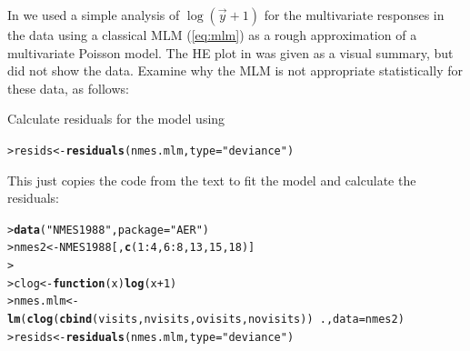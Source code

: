 \documentclass[10pt]{report}\usepackage[]{graphicx}\usepackage[]{color}
\makeatletter
\newcommand{\hlnum}[1]{\textcolor[rgb]{0.686,0.059,0.569}{#1}}%
\newcommand{\hlstr}[1]{\textcolor[rgb]{0.192,0.494,0.8}{#1}}%
\newcommand{\hlopt}[1]{\textcolor[rgb]{0,0,0}{#1}}%
\newcommand{\hlstd}[1]{\textcolor[rgb]{0.345,0.345,0.345}{#1}}%
\newcommand{\hlkwa}[1]{\textcolor[rgb]{0.161,0.373,0.58}{\textbf{#1}}}%
\newcommand{\hlkwb}[1]{\textcolor[rgb]{0.69,0.353,0.396}{#1}}%
\newcommand{\hlkwc}[1]{\textcolor[rgb]{0.333,0.667,0.333}{#1}}%
\newcommand{\hlkwd}[1]{\textcolor[rgb]{0.737,0.353,0.396}{\textbf{#1}}}%
\newenvironment{kframe}{%
 \def\at@end@of@kframe{}%
 \ifinner\ifhmode%
  \def\at@end@of@kframe{\end{minipage}}%
  \begin{minipage}{\columnwidth}%
 \fi\fi%
 \def\FrameCommand##1{\hskip\@totalleftmargin \hskip-\fboxsep
 \colorbox{shadecolor}{##1}\hskip-\fboxsep
     \hskip-\linewidth \hskip-\@totalleftmargin \hskip\columnwidth}%
 \MakeFramed {\advance\hsize-\width
   \@totalleftmargin\z@ \linewidth\hsize
   \@setminipage}}%
 {\par\unskip\endMakeFramed%
 \at@end@of@kframe}
\newenvironment{knitrout}{}{} %
\renewenvironment{knitrout}{\small\renewcommand{\baselinestretch}{.85}}{} %
\makeatother
\begin{document}
\begin{Exercises}
  \exercise In  we used a simple analysis of $\log(\vec{y}+1)$ for the multivariate responses
  in the  data using a classical MLM (\eqref{eq:mlm})
  as a rough approximation of a multivariate Poisson model.
  The HE plot in  was given as a visual summary, but did not show the data.
  Examine why the MLM is not appropriate statistically for these data, as follows:
  \begin{enumerate*}
    \item Calculate residuals for the model  using
\begin{knitrout}\footnotesize
{}\color{fgcolor}\begin{kframe}
\begin{alltt}
\hlstd{> }\hlstd{resids} \hlkwb{<-} \hlkwd{residuals}\hlstd{(nmes.mlm,} \hlkwc{type}\hlstd{=}\hlstr{"deviance"}\hlstd{)}
\end{alltt}
\end{kframe}
\end{knitrout}
    \begin{ans}
    This just copies the code from the text to fit the model and calculate the residuals:
\begin{knitrout}\footnotesize
{}\color{fgcolor}\begin{kframe}
\begin{alltt}
\hlstd{> }\hlkwd{data}\hlstd{(}\hlstr{"NMES1988"}\hlstd{,} \hlkwc{package}\hlstd{=}\hlstr{"AER"}\hlstd{)}
\hlstd{> }\hlstd{nmes2} \hlkwb{<-} \hlstd{NMES1988[,} \hlkwd{c}\hlstd{(}\hlnum{1}\hlopt{:}\hlnum{4}\hlstd{,} \hlnum{6}\hlopt{:}\hlnum{8}\hlstd{,} \hlnum{13}\hlstd{,} \hlnum{15}\hlstd{,} \hlnum{18}\hlstd{)]}
\hlstd{> }
\hlstd{> }\hlstd{clog} \hlkwb{<-} \hlkwa{function}\hlstd{(}\hlkwc{x}\hlstd{)} \hlkwd{log}\hlstd{(x}\hlopt{+}\hlnum{1}\hlstd{)}
\hlstd{> }\hlstd{nmes.mlm} \hlkwb{<-} \hlkwd{lm}\hlstd{(}\hlkwd{clog}\hlstd{(}\hlkwd{cbind}\hlstd{(visits, nvisits, ovisits, novisits))} \hlopt{~} \hlstd{.,} \hlkwc{data}\hlstd{=nmes2)}
\hlstd{> }\hlstd{resids} \hlkwb{<-} \hlkwd{residuals}\hlstd{(nmes.mlm,} \hlkwc{type}\hlstd{=}\hlstr{"deviance"}\hlstd{)}
\end{alltt}
\end{kframe}
\end{knitrout}
    \end{ans}
		

\end{enumerate*}
\end{Exercises}
\end{document}
